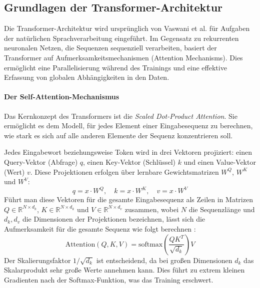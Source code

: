 \subsection{Grundlagen der Transformer-Architektur}
\label{subsec:transformer_grundlagen}

Die Transformer-Architektur wird ursprünglich von Vaswani et al. \cite{vaswani2017attention_neurips} für Aufgaben der natürlichen Sprachverarbeitung eingeführt. Im Gegensatz zu rekurrenten neuronalen Netzen, die Sequenzen sequenziell verarbeiten, basiert der Transformer auf Aufmerksamkeitsmechanismen (Attention Mechanisms). Dies ermöglicht eine Parallelisierung während des Trainings und eine effektive Erfassung von globalen Abhängigkeiten in den Daten.

\paragraph{Der Self-Attention-Mechanismus}
Das Kernkonzept des Transformers ist die \emph{Scaled Dot-Product Attention}. Sie ermöglicht es dem Modell, für jedes Element einer Eingabesequenz zu berechnen, wie stark es sich auf alle anderen Elemente der Sequenz konzentrieren soll.

Jedes Eingabewort beziehungsweise Token wird in drei Vektoren projiziert: einen Query-Vektor (Abfrage) $q$, einen Key-Vektor (Schlüssel) $k$ und einen Value-Vektor (Wert) $v$. Diese Projektionen erfolgen über lernbare Gewichtsmatrizen $W^Q$, $W^K$ und $W^V$:
\begin{equation}
    q = x \cdot W^Q, \quad k = x \cdot W^K, \quad v = x \cdot W^V
\end{equation}
Führt man diese Vektoren für die gesamte Eingabesequenz als Zeilen in Matrizen $Q \in \mathbb{R}^{N \times d_k}$, $K \in \mathbb{R}^{N \times d_k}$ und $V \in \mathbb{R}^{N \times d_v}$ zusammen, wobei $N$ die Sequenzlänge und $d_k, d_v$ die Dimensionen der Projektionen bezeichnen, lässt sich die Aufmerksamkeit für die gesamte Sequenz wie folgt berechnen \cite{vaswani2017attention_neurips}:
\begin{equation}
    \text{Attention}(Q, K, V) = \text{softmax}\left(\frac{QK^T}{\sqrt{d_k}}\right)V
\end{equation}
Der Skalierungsfaktor $1/\sqrt{d_k}$ ist entscheidend, da bei großen Dimensionen $d_k$ das Skalarprodukt sehr große Werte annehmen kann. Dies führt zu extrem kleinen Gradienten nach der Softmax-Funktion, was das Training erschwert.

